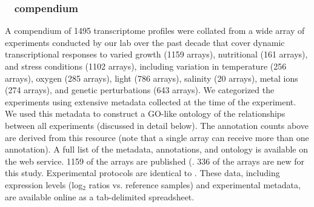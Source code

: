 
\subsubsection{\halo~ compendium}\label{halodata}

A compendium of 1495 transcriptome profiles were collated from a wide
array of experiments conducted by our lab over the past decade that
cover dynamic transcriptional responses to varied growth (1159 arrays), nutritional (161 arrays),
and stress conditions (1102 arrays), including variation in temperature (256 arrays), 
oxygen (285 arrays), light (786 arrays), salinity (20 arrays), 
metal ions (274 arrays), and genetic perturbations (643 arrays). 
We categorized the experiments using extensive metadata collected at
the time of the experiment. We used this metadata to construct a GO-like 
ontology of the relationships between all experiments (discussed in detail below).
The annotation counts above are derived from this resource (note that a single array can 
receive more than one annotation).
A full list of the metadata, annotations, and ontology is available on the web service.
1159 of the arrays are published (\cite{Baliga2004a,Baliga2002,Bonneau2007,Facciotti2010,Facciotti2007a,Kaur2006,Kaur2010,Schmid2011,Schmid2007,Schmid2009,Whitehead2006,Whitehead2009}. 336 of the arrays are new for this study. Experimental protocols are
identical to \cite{Bonneau2007}. These data, including expression
levels (log$_2$ ratios vs. reference samples) and experimental
metadata, are available online as a tab-delimited spreadsheet.


